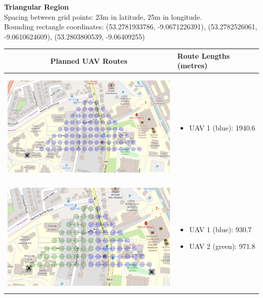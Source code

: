 \textbf{Triangular Region}
\\Spacing between grid points: 23m in latitude, 25m in longitude.
\\Bounding rectangle coordinates: (53.2781933786, -9.0671226391), (53.2782526061, -9.0610624609), (53.2803800539, -9.06409255)
\\
\begin{table}[h!]
  \centering
  \begin{tabular}{ | c | m{5cm} | }
    \hline
    Planned UAV Routes & Route Lengths (metres) \\
    \hline
    
    \begin{minipage}[c][57mm][c]{.6\textwidth}
      \includegraphics[width=\linewidth, height=55mm]{Chapters/MultiAgentCoverage/MultipleTravellingSalesman/Figs/Triangle/OneRAV.PNG}
    \end{minipage}
    &
    \begin{itemize}[leftmargin=*]
      \item[] UAV 1 (blue): 1940.6
    \end{itemize}
    \\
    \hline
    \begin{minipage}[c][57mm][c]{.6\textwidth}
      \includegraphics[width=\linewidth, height=55mm]{Chapters/MultiAgentCoverage/MultipleTravellingSalesman/Figs/Triangle/TwoRAV.PNG}
    \end{minipage}
    &
    \begin{itemize}[leftmargin=*]
        \item[] UAV 1 (blue): 930.7
        \item[] UAV 2 (green): 971.8
    \end{itemize}
    \\
    \hline
    

\end{tabular}
\end{table}
